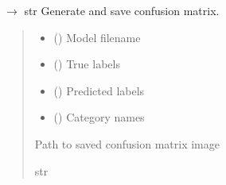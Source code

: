 \documentclass[letterpaper,10pt,english]{sphinxmanual}
\begin{document}
\begin{fulllineitems}
\label{\detokenize{autoapi/src/CNNTrainer/index:src.CNNTrainer.confusion_matrix}}
\pysigstartsignatures
\pysiglinewithargsret
{}
{\sphinxparamcomma {}\sphinxparamcomma {}\sphinxparamcomma {}}
{{ $\rightarrow$ str}}
\pysigstopsignatures
\sphinxAtStartPar
Generate and save confusion matrix.
\begin{quote}\begin{description}
\begin{itemize}
\item {} 
\sphinxAtStartPar
{} () \textendash{} Model filename

\item {} 
\sphinxAtStartPar
{} () \textendash{} True labels

\item {} 
\sphinxAtStartPar
{} () \textendash{} Predicted labels

\item {} 
\sphinxAtStartPar
{} (\sphinxstyleliteralemphasis{\sphinxupquote{{[}}}\sphinxstyleliteralemphasis{\sphinxupquote{{]}}}) \textendash{} Category names

\end{itemize}

\sphinxAtStartPar
Path to saved confusion matrix image

\sphinxAtStartPar
str

\end{description}\end{quote}

\end{fulllineitems}
\end{document}
